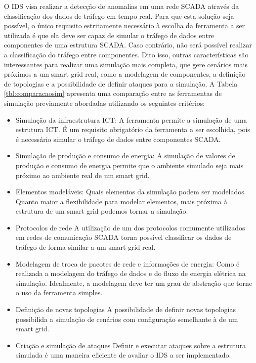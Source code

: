 \documentclass[cic,tc]{iiufrgs}
\begin{document}
O IDS visa realizar a detecção de anomalias em uma rede SCADA através da classificação dos dados de tráfego em tempo real. Para que esta solução seja possível, o único requisito estritamente necessário à escolha da ferramenta a ser utilizada é que ela deve ser capaz de simular o tráfego de dados entre componentes de uma estrutura SCADA. Caso contrário, não será possível realizar a classificação do tráfego entre componentes. Dito isso, outras características são interessantes para realizar uma simulação mais completa, que gere cenários mais próximos a um smart grid real, como a modelagem de componentes, a definição de topologias e a possibilidade de definir ataques para a simulação. A Tabela \ref{tbl:comparacaosim} apresenta uma comparação entre as ferramentas de simulação previamente abordadas utilizando os seguintes critérios:

\begin{itemize}
\item{Simulação da infraestrutura ICT}: A ferramenta permite a simulação de uma estrutura ICT. É um requisito obrigatório da ferramenta a ser escolhida, pois é necessário simular o tráfego de dados entre componentes SCADA.
\item{Simulação de produção e consumo de energia}: A simulação de valores de produção e consumo de energia permite que o ambiente simulado seja mais próximo ao ambiente real de um smart grid.
\item{Elementos modeláveis}: Quais elementos da simulação podem ser modelados. Quanto maior a flexibilidade para modelar elementos, mais próxima à estrutura de um smart grid podemos tornar a simulação.
\item{Protocolos de rede} A utilização de um dos protocolos comumente utilizados em redes de comunicação SCADA torna possível classificar os dados de tráfego de forma similar a um smart grid real.
\item{Modelagem de troca de pacotes de rede e informações de energia}: Como é realizada a modelagem do tráfego de dados e do fluxo de energia elétrica na simulação. Idealmente, a modelagem deve ter um grau de abstração que torne o uso da ferramenta simples.
\item{Definição de novas topologias} A possibilidade de definir novas topologias possibilida a simulação de cenários com configuração semelhante à de um smart grid.
\item{Criação e simulação de ataques} Definir e executar ataques sobre a estrutura simulada é uma maneira eficiente de avaliar o IDS a ser implementado.
\end{itemize}
\end{document}

